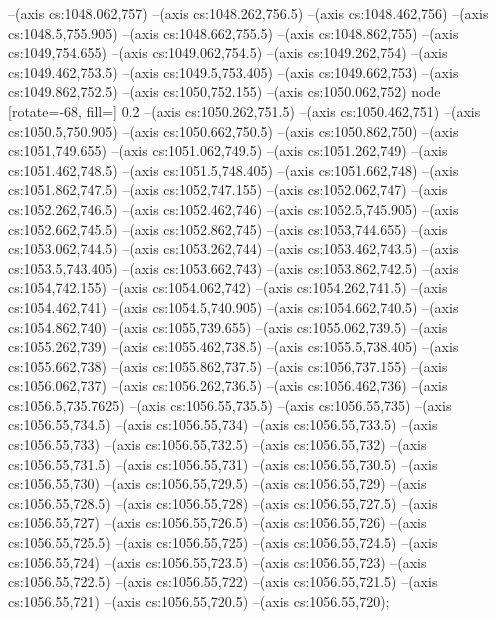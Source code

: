 --(axis cs:1048.062,757)
--(axis cs:1048.262,756.5)
--(axis cs:1048.462,756)
--(axis cs:1048.5,755.905)
--(axis cs:1048.662,755.5)
--(axis cs:1048.862,755)
--(axis cs:1049,754.655)
--(axis cs:1049.062,754.5)
--(axis cs:1049.262,754)
--(axis cs:1049.462,753.5)
--(axis cs:1049.5,753.405)
--(axis cs:1049.662,753)
--(axis cs:1049.862,752.5)
--(axis cs:1050,752.155)
--(axis cs:1050.062,752) node [rotate=-68, fill=\bgcol] {0.2}
--(axis cs:1050.262,751.5)
--(axis cs:1050.462,751)
--(axis cs:1050.5,750.905)
--(axis cs:1050.662,750.5)
--(axis cs:1050.862,750)
--(axis cs:1051,749.655)
--(axis cs:1051.062,749.5)
--(axis cs:1051.262,749)
--(axis cs:1051.462,748.5)
--(axis cs:1051.5,748.405)
--(axis cs:1051.662,748)
--(axis cs:1051.862,747.5)
--(axis cs:1052,747.155)
--(axis cs:1052.062,747)
--(axis cs:1052.262,746.5)
--(axis cs:1052.462,746)
--(axis cs:1052.5,745.905)
--(axis cs:1052.662,745.5)
--(axis cs:1052.862,745)
--(axis cs:1053,744.655)
--(axis cs:1053.062,744.5)
--(axis cs:1053.262,744)
--(axis cs:1053.462,743.5)
--(axis cs:1053.5,743.405)
--(axis cs:1053.662,743)
--(axis cs:1053.862,742.5)
--(axis cs:1054,742.155)
--(axis cs:1054.062,742)
--(axis cs:1054.262,741.5)
--(axis cs:1054.462,741)
--(axis cs:1054.5,740.905)
--(axis cs:1054.662,740.5)
--(axis cs:1054.862,740)
--(axis cs:1055,739.655)
--(axis cs:1055.062,739.5)
--(axis cs:1055.262,739)
--(axis cs:1055.462,738.5)
--(axis cs:1055.5,738.405)
--(axis cs:1055.662,738)
--(axis cs:1055.862,737.5)
--(axis cs:1056,737.155)
--(axis cs:1056.062,737)
--(axis cs:1056.262,736.5)
--(axis cs:1056.462,736)
--(axis cs:1056.5,735.7625)
--(axis cs:1056.55,735.5)
--(axis cs:1056.55,735)
--(axis cs:1056.55,734.5)
--(axis cs:1056.55,734)
--(axis cs:1056.55,733.5)
--(axis cs:1056.55,733)
--(axis cs:1056.55,732.5)
--(axis cs:1056.55,732)
--(axis cs:1056.55,731.5)
--(axis cs:1056.55,731)
--(axis cs:1056.55,730.5)
--(axis cs:1056.55,730)
--(axis cs:1056.55,729.5)
--(axis cs:1056.55,729)
--(axis cs:1056.55,728.5)
--(axis cs:1056.55,728)
--(axis cs:1056.55,727.5)
--(axis cs:1056.55,727)
--(axis cs:1056.55,726.5)
--(axis cs:1056.55,726)
--(axis cs:1056.55,725.5)
--(axis cs:1056.55,725)
--(axis cs:1056.55,724.5)
--(axis cs:1056.55,724)
--(axis cs:1056.55,723.5)
--(axis cs:1056.55,723)
--(axis cs:1056.55,722.5)
--(axis cs:1056.55,722)
--(axis cs:1056.55,721.5)
--(axis cs:1056.55,721)
--(axis cs:1056.55,720.5)
--(axis cs:1056.55,720);

